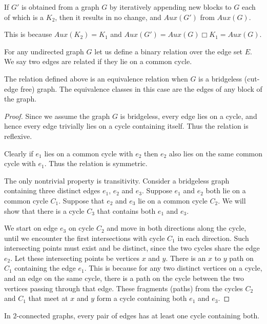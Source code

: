 \documentclass{llncs}
\begin{document}
\begin{lemma}
	If $G'$ is obtained from a graph $G$ by iteratively appending new blocks to $G$ each of which is a $K_2$, then it results in no change, and $Aux(G')$ from $Aux(G)$.  
\end{lemma}

This is because $Aux(K_2)=K_1$ and $Aux(G')=Aux(G)\Box K_1=Aux(G)$.

\begin{definition}
	For any undirected graph $G$ let us define a binary relation over the edge set $E$. We say two edges are related if they lie on a common cycle.
\end{definition}

\begin{lemma}
	The relation defined above is an equivalence relation when $G$ is a bridgeless (cut-edge free) graph. The equivalence classes in this case are the edges of any block of the graph.
\end{lemma}
\begin{proof}
	Since we assume the graph $G$ is bridgeless, every edge lies on a cycle, and hence every edge trivially lies on a cycle containing itself. Thus the relation is reflexive.
	
	Clearly if $e_1$ lies on a common cycle with $e_2$ then $e_2$ also lies on the same common cycle with $e_1$. Thus the relation is symmetric.
	
	The only nontrivial property is transitivity. Consider a bridgeless graph containing three distinct edges $e_1$, $e_2$ and $e_3$. Suppose $e_1$ and $e_2$ both lie on a common cycle $C_1$. Suppose that $e_2$ and $e_3$ lie on a common cycle $C_2$. We will show that there is a cycle $C_3$ that contains both $e_1$ and $e_3$. 
	
	We start on edge $e_3$ on cycle $C_2$ and move in both directions along the cycle, until we encounter the first intersections with cycle $C_1$ in each direction. Such intersecting points must exist and be distinct, since the two cycles share the edge $e_2$. Let these intersecting points be vertices $x$ and $y$. There is an $x$ to $y$ path on $C_1$ containing the edge $e_1$. This is because for any two distinct vertices on a cycle, and an edge on the same cycle, there is a path on the cycle between the two vertices passing through that edge. These fragments (paths) from the cycles $C_2$ and $C_1$ that meet at $x$ and $y$ form a cycle containing both $e_1$ and $e_3$. 
\end{proof}
\begin{lemma} \label{onec}
	In $2$-connected graphs, every pair of edges has at least one cycle containing both.
\end{lemma}
\end{document}
